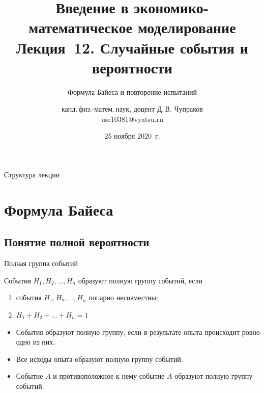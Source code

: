 \documentclass[unicode,11pt,notheorems,xcolor=table]{beamer}
\author[Д.\,В. Чупраков]{канд.\,физ.-матем.\,наук, доцент Д.\,В. Чупраков\\[6pt] usr10381@vyatsu.ru}
\institute[ВятГУ]{ФГБОУ ВО Вятский государственный университет}
\title[Лекция~13. Случайные события и вероятности]{
	Введение в экономико-математическое моделирование\\[12pt]
	Лекция~12. Случайные события и вероятности}
\subtitle{Формула Байеса и повторение испытаний}
\date{25 ноября 2020~г.}
\begin{document}
\maketitle

\begin{frame}{Структура лекции}
	\tableofcontents
\end{frame}

\section{Формула Байеса}

\subsection{Понятие полной вероятности}
\begin{frame}{Полная группа событий}{}
    \begin{block}{}
        События $H_1, H_2,\ldots, H_n$ образуют \alert{полную группу событий}, если 
        \begin{enumerate}
            \item события \alert{$H_1, H_2,\ldots, H_n$} попарно \underline{несовместны};
            \item \alert{$H_1+H_2+\ldots+H_n = 1$}
        \end{enumerate}
    \end{block}

    \bigskip
    \begin{itemize}
        \item События образуют полную группу, если в результате опыта происходит ровно одно из них.
        \item Все исходы опыта образуют полную группу событий.
        \item Событие $A$ и противоположное к нему событие $\overline{A}$ образуют полную группу событий.
    \end{itemize}
\end{frame}
\end{document}
